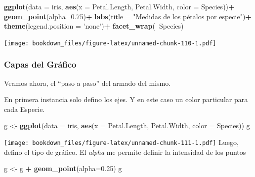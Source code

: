 \documentclass[]{book}
\newenvironment{Shaded}{\begin{snugshade}}{\end{snugshade}}
\newcommand{\DataTypeTok}[1]{\textcolor[rgb]{0.13,0.29,0.53}{#1}}
\newcommand{\FloatTok}[1]{\textcolor[rgb]{0.00,0.00,0.81}{#1}}
\newcommand{\KeywordTok}[1]{\textcolor[rgb]{0.13,0.29,0.53}{\textbf{#1}}}
\newcommand{\NormalTok}[1]{#1}
\newcommand{\OperatorTok}[1]{\textcolor[rgb]{0.81,0.36,0.00}{\textbf{#1}}}
\newcommand{\StringTok}[1]{\textcolor[rgb]{0.31,0.60,0.02}{#1}}
\begin{document}
\begin{Shaded}
\begin{Highlighting}[]
\KeywordTok{ggplot}\NormalTok{(}\DataTypeTok{data =}\NormalTok{ iris, }\KeywordTok{aes}\NormalTok{(}\DataTypeTok{x =}\NormalTok{ Petal.Length, Petal.Width, }\DataTypeTok{color =}\NormalTok{ Species))}\OperatorTok{+}
\StringTok{  }\KeywordTok{geom_point}\NormalTok{(}\DataTypeTok{alpha=}\FloatTok{0.75}\NormalTok{)}\OperatorTok{+}
\StringTok{  }\KeywordTok{labs}\NormalTok{(}\DataTypeTok{title =} \StringTok{"Medidas de los pétalos por especie"}\NormalTok{)}\OperatorTok{+}
\StringTok{  }\KeywordTok{theme}\NormalTok{(}\DataTypeTok{legend.position =} \StringTok{'none'}\NormalTok{)}\OperatorTok{+}
\StringTok{  }\KeywordTok{facet_wrap}\NormalTok{(}\OperatorTok{~}\NormalTok{Species)}
\end{Highlighting}
\end{Shaded}

\texttt{[image: bookdown\_files/figure-latex/unnamed-chunk-110-1.pdf]}

\hypertarget{capas-del-grafico}{%
\subsubsection{Capas del Gráfico}\label{capas-del-grafico}}

Veamos ahora, el ``paso a paso'' del armado del mismo.

En primera instancia solo defino los ejes. Y en este caso un color particular para cada Especie.

\begin{Shaded}
\begin{Highlighting}[]
\NormalTok{g <-}\StringTok{ }\KeywordTok{ggplot}\NormalTok{(}\DataTypeTok{data =}\NormalTok{ iris, }\KeywordTok{aes}\NormalTok{(}\DataTypeTok{x =}\NormalTok{ Petal.Length, Petal.Width, }\DataTypeTok{color =}\NormalTok{ Species))}
\NormalTok{g}
\end{Highlighting}
\end{Shaded}

\texttt{[image: bookdown\_files/figure-latex/unnamed-chunk-111-1.pdf]}
Luego, defino el tipo de gráfico. El \emph{alpha} me permite definir la intensidad de los puntos

\begin{Shaded}
\begin{Highlighting}[]
\NormalTok{g <-}\StringTok{ }\NormalTok{g }\OperatorTok{+}\StringTok{  }\KeywordTok{geom_point}\NormalTok{(}\DataTypeTok{alpha=}\FloatTok{0.25}\NormalTok{)}
\NormalTok{g}
\end{Highlighting}
\end{Shaded}
\end{document}
